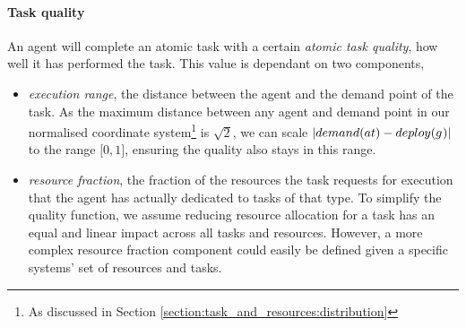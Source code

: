 \paragraph{Task quality}
\label{section:task_quality}
\newcommand{\functionAtomicTaskQualitySymbol}[2]{\functionSymbol{atq_{#1}^{#2}}}
\newcommand{\functionAtomicTaskQualitySignature}[2]{
	\ifx&#1&
	\functionSignature{\functionAtomicTaskQualitySymbol{}{}} {\varAtomicTask{}{}, \varAgent{}{}}
	\else
	\functionSignature{\functionAtomicTaskQualitySymbol{}{}}{#1, #2}
	\fi
}
\newcommand{\functionAtomicTaskQualitySensor}[2]{
	\functionSignature{\functionAtomicTaskQualitySymbol{}{}} {\varAtomicTask{}{}, \functionDetectorRole{}{}}
}

\newcommand{\functionComponentTaskValue}[2]{
	\functionSignature{ctv}{\varAtomicTask{}{}}
}
\newcommand{\formalComponentTaskValue}[2]{
	\functionFormal{ctv}{\setAtomicTask{}{}}{\setRealNumbersNonNegative{}{}}
}
\newcommand{\functionSystemUtility}[2]{\functionSignature{utility}{\setTime{}{}}}
\newcommand{\functionCompositeTaskQuality}[2]{
	\functionSignature{taq_\varTime{}{}}{\varCompositeTask{}{}}
}
\newcommand{\functionTaskAbsoluteValue}[2]{
	\functionSignature{atv}{\varCompositeTask{}{}, \varAtomicTask{}{}}
}

\newcommand{\functionRelativeDistance}[2]{
	\functionSignature{dist}{\varAtomicTask{}{}, \varAgent{}{}}
}
\newcommand{\formalExecutionRange}[2]{
	\functionFormal{execrange}
	{\setAtomicTask{}{} \times \setAgent{}{}}
	{\setRealNumbersNonNegative{}{}}
}
\newcommand{\functionExecutionRange}[2]{
	\functionSignature{execrange}
	{\varAtomicTask{}{}, \varAgent{}{}}
}
An agent will complete an atomic task with a certain \textit{atomic task quality}, how well it has performed the task. This value is dependant on two components,
\begin{itemize}
	\item \textit{execution range}, the distance between the agent and the demand point of the task. As the maximum distance between any agent and demand point in our normalised coordinate system\footnote{As discussed in Section \ref{section:task_and_resources:distribution}} is $\sqrt{2}$, we can scale $\funcSize{ \functionTaskDemandPoint{}{} - \functionSignature{deploy}{\varAgent{}{}}}$ to the range $\lbrack 0, 1 \rbrack$, ensuring the quality also stays in this range.
	\item \textit{resource fraction}, the fraction of the resources the task requests for execution that the agent has actually dedicated to tasks of that type. To simplify the quality function, we assume reducing resource allocation for a task has an equal and linear impact across all tasks and resources. However, a more complex resource fraction component could easily be defined given a specific systems' set of resources and tasks.
\end{itemize}

